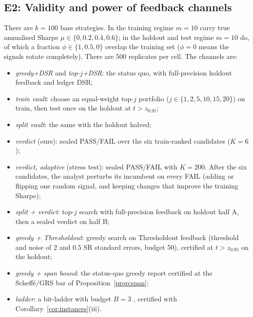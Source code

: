 \documentclass[11pt]{article}
\theoremstyle{definition}
\theoremstyle{remark}
\begin{document}
\subsection{E2: Validity and power of feedback channels}
There are $k=100$ base strategies. In the training regime $m=10$ carry true annualised Sharpe $\mu\in\{0,0.2,0.4,0.6\}$; in the holdout and test regime $m=10$ do, of which a fraction $\phi\in\{1,0.5,0\}$ overlap the training set ($\phi=0$ means the signals rotate completely). There are 500 replicates per cell. The channels are:
\begin{itemize}[leftmargin=*,itemsep=1pt]
\item \emph{greedy+DSR} and \emph{top-$j$+DSR}: the status quo, with full-precision holdout feedback and ledger DSR;
\item \emph{train vault}: choose an equal-weight top-$j$ portfolio ($j\in\{1,2,5,10,15,20\}$) on train, then test once on the holdout at $t>z_{0.95}$;
\item \emph{split vault}: the same with the holdout halved;
\item \emph{verdict} (ours): sealed PASS/FAIL over the six train-ranked candidates ($K=6$);
\item \emph{verdict, adaptive} (stress test): sealed PASS/FAIL with $K=200$. After the six candidates, the analyst perturbs its incumbent on every FAIL (adding or flipping one random signal, and keeping changes that improve the training Sharpe);
\item \emph{split + verdict}: top-$j$ search with full-precision feedback on holdout half A, then a sealed verdict on half B;
\item \emph{greedy + Thresholdout}: greedy search on Thresholdout feedback \citep{dwork2015science} (threshold and noise of 2 and 0.5 SR standard errors, budget 50), certified at $t>z_{0.95}$ on the holdout;
\item \emph{greedy + span bound}: the status-quo greedy report certified at the Scheff\'e/GRS bar of Proposition~\ref{prop:span};
\item \emph{ladder}: a bit-ladder with budget $B=3$ \citep{blum2015ladder}, certified with Corollary~\ref{cor:instances}(iii).
\end{itemize}


\end{document}
